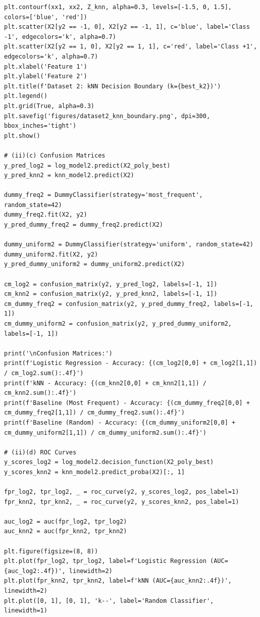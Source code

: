 \documentclass[11pt,a4paper]{article}
\begin{document}
\begin{lstlisting}
plt.contourf(xx1, xx2, Z_knn, alpha=0.3, levels=[-1.5, 0, 1.5], colors=['blue', 'red'])
plt.scatter(X2[y2 == -1, 0], X2[y2 == -1, 1], c='blue', label='Class -1', edgecolors='k', alpha=0.7)
plt.scatter(X2[y2 == 1, 0], X2[y2 == 1, 1], c='red', label='Class +1', edgecolors='k', alpha=0.7)
plt.xlabel('Feature 1')
plt.ylabel('Feature 2')
plt.title(f'Dataset 2: kNN Decision Boundary (k={best_k2})')
plt.legend()
plt.grid(True, alpha=0.3)
plt.savefig('figures/dataset2_knn_boundary.png', dpi=300, bbox_inches='tight')
plt.show()

# (ii)(c) Confusion Matrices
y_pred_log2 = log_model2.predict(X2_poly_best)
y_pred_knn2 = knn_model2.predict(X2)

dummy_freq2 = DummyClassifier(strategy='most_frequent', random_state=42)
dummy_freq2.fit(X2, y2)
y_pred_dummy_freq2 = dummy_freq2.predict(X2)

dummy_uniform2 = DummyClassifier(strategy='uniform', random_state=42)
dummy_uniform2.fit(X2, y2)
y_pred_dummy_uniform2 = dummy_uniform2.predict(X2)

cm_log2 = confusion_matrix(y2, y_pred_log2, labels=[-1, 1])
cm_knn2 = confusion_matrix(y2, y_pred_knn2, labels=[-1, 1])
cm_dummy_freq2 = confusion_matrix(y2, y_pred_dummy_freq2, labels=[-1, 1])
cm_dummy_uniform2 = confusion_matrix(y2, y_pred_dummy_uniform2, labels=[-1, 1])

print('\nConfusion Matrices:')
print(f'Logistic Regression - Accuracy: {(cm_log2[0,0] + cm_log2[1,1]) / cm_log2.sum():.4f}')
print(f'kNN - Accuracy: {(cm_knn2[0,0] + cm_knn2[1,1]) / cm_knn2.sum():.4f}')
print(f'Baseline (Most Frequent) - Accuracy: {(cm_dummy_freq2[0,0] + cm_dummy_freq2[1,1]) / cm_dummy_freq2.sum():.4f}')
print(f'Baseline (Random) - Accuracy: {(cm_dummy_uniform2[0,0] + cm_dummy_uniform2[1,1]) / cm_dummy_uniform2.sum():.4f}')

# (ii)(d) ROC Curves
y_scores_log2 = log_model2.decision_function(X2_poly_best)
y_scores_knn2 = knn_model2.predict_proba(X2)[:, 1]

fpr_log2, tpr_log2, _ = roc_curve(y2, y_scores_log2, pos_label=1)
fpr_knn2, tpr_knn2, _ = roc_curve(y2, y_scores_knn2, pos_label=1)

auc_log2 = auc(fpr_log2, tpr_log2)
auc_knn2 = auc(fpr_knn2, tpr_knn2)

plt.figure(figsize=(8, 8))
plt.plot(fpr_log2, tpr_log2, label=f'Logistic Regression (AUC={auc_log2:.4f})', linewidth=2)
plt.plot(fpr_knn2, tpr_knn2, label=f'kNN (AUC={auc_knn2:.4f})', linewidth=2)
plt.plot([0, 1], [0, 1], 'k--', label='Random Classifier', linewidth=1)


\end{lstlisting}
\end{document}
